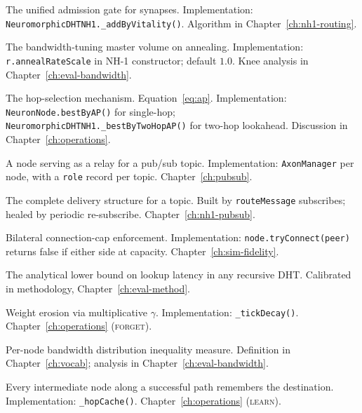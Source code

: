\documentclass[twoside,nobib]{tufte-book}
\begin{document}
\begin{description}\setlength\itemsep{0.4em}

\item[\textsc{addByVitality}] The unified admission gate for
synapses. Implementation:
\texttt{NeuromorphicDHTNH1.\_addByVitality()}. Algorithm in
Chapter~\ref{ch:nh1-routing}.

\item[\textsc{annealRateScale}] The bandwidth-tuning master
volume on annealing. Implementation: \texttt{r.annealRateScale}
in NH-1 constructor; default $1.0$. Knee analysis in
Chapter~\ref{ch:eval-bandwidth}.

\item[\textsc{AP scoring}] The hop-selection mechanism.
Equation~\ref{eq:ap}. Implementation:
\texttt{NeuronNode.bestByAP()} for single-hop;
\texttt{NeuromorphicDHTNH1.\_bestByTwoHopAP()} for two-hop
lookahead. Discussion in Chapter~\ref{ch:operations}.

\item[\textsc{axon}] A node serving as a relay for a pub/sub
topic. Implementation: \texttt{AxonManager} per node, with a
\texttt{role} record per topic. Chapter~\ref{ch:pubsub}.

\item[\textsc{axonal tree}] The complete delivery structure for
a topic. Built by \texttt{routeMessage} subscribes; healed by
periodic re-subscribe. Chapter~\ref{ch:nh1-pubsub}.

\item[\textsc{bilateral cap}] Bilateral connection-cap
enforcement. Implementation: \texttt{node.tryConnect(peer)}
returns false if either side at capacity.
Chapter~\ref{ch:sim-fidelity}.

\item[\textsc{Dabek $3\delta$ floor}] The analytical lower bound
on lookup latency in any recursive DHT. Calibrated in
methodology, Chapter~\ref{ch:eval-method}.

\item[\textsc{decay}] Weight erosion via multiplicative
$\gamma$. Implementation: \texttt{\_tickDecay()}.
Chapter~\ref{ch:operations} (\textsc{forget}).

\item[\textsc{Gini coefficient}] Per-node bandwidth
distribution inequality measure. Definition in
Chapter~\ref{ch:vocab}; analysis in Chapter~\ref{ch:eval-bandwidth}.

\item[\textsc{hop caching}] Every intermediate node along a
successful path remembers the destination. Implementation:
\texttt{\_hopCache()}. Chapter~\ref{ch:operations}
(\textsc{learn}).


\end{description}
\end{document}

